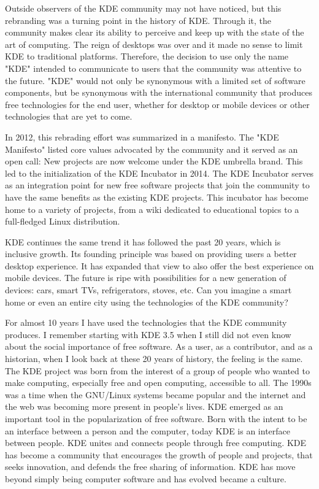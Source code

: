 Outside observers of the KDE community may not have noticed, but this rebranding was a turning point in the history of KDE. Through it, the community makes clear its ability to perceive and keep up with the state of the art of computing. The reign of desktops was over and it made no sense to limit KDE to traditional platforms. Therefore, the decision to use only the name "KDE" intended to communicate to users that the community was attentive to the future. "KDE" would not only be synonymous with a limited set of software components, but be synonymous with the international community that produces free technologies for the end user, whether for desktop or mobile devices or other technologies that are yet to come. 

In 2012, this rebrading effort was summarized in a manifesto. The "KDE Manifesto" listed core values advocated by the community and it served as an open call: New projects are now welcome under the KDE umbrella brand. This led to the initialization of the KDE Incubator in 2014. The KDE Incubator serves as an integration point for new free software projects that join the community to have the same benefits as the existing KDE projects. This incubator has become home to a variety of projects, from a wiki dedicated to educational topics to a full-fledged Linux distribution. 

KDE continues the same trend it has followed the past 20 years, which is inclusive growth. Its founding principle was based on providing users a better desktop experience. It has expanded that view to also offer the best experience on mobile devices. The future is ripe with possibilities for a new generation of devices: cars, smart TVs, refrigerators, stoves, etc. Can you imagine a smart home or even an entire city using the technologies of the KDE community? 

For almost 10 years I have used the technologies that the KDE community produces. I remember starting with KDE 3.5 when I still did not even know about the social importance of free software. As a user, as a contributor, and as a historian, when I look back at these 20 years of history, the feeling is the same. The KDE project was born from the interest of a group of people who wanted to make computing, especially free and open computing, accessible to all. The 1990s was a time when the GNU/Linux systems became popular and the internet and the web was becoming more present in people's lives. KDE emerged as an important tool in the popularization of free software. Born with the intent to be an interface between a person and the computer, today KDE is an interface between people. KDE unites and connects people through free computing. KDE has become a community that encourages the growth of people and projects, that seeks innovation, and defends the free sharing of information. KDE has move beyond simply being computer software and has evolved became a culture.
